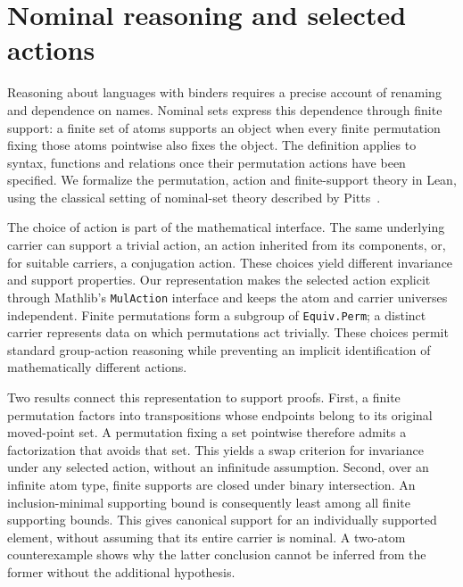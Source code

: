\section{Nominal reasoning and selected actions}
\label{sec:introduction}

Reasoning about languages with binders requires a precise account of renaming
and dependence on names. Nominal sets express this dependence through finite
support: a finite set of atoms supports an object when every finite permutation
fixing those atoms pointwise also fixes the object. The definition applies to
syntax, functions and relations once their permutation actions have been
specified. We formalize the permutation, action and finite-support theory in
Lean, using the classical setting of nominal-set theory described by
Pitts~\cite[Chapters 1--2]{pitts2013}.

The choice of action is part of the mathematical interface. The same underlying
carrier can support a trivial action, an action inherited from its components,
or, for suitable carriers, a conjugation action. These choices yield different
invariance and support properties. Our representation makes the selected
action explicit through Mathlib's \texttt{MulAction} interface and keeps the
atom and carrier universes independent. Finite permutations form a subgroup of
\texttt{Equiv.Perm}; a distinct carrier represents data on which permutations
act trivially. These choices permit standard group-action reasoning while
preventing an implicit identification of mathematically different actions.

Two results connect this representation to support proofs. First, a finite
permutation factors into transpositions whose endpoints belong to its original
moved-point set. A permutation fixing a set pointwise therefore admits a
factorization that avoids that set. This yields a swap criterion for invariance
under any selected action, without an infinitude assumption. Second, over an
infinite atom type, finite supports are closed under binary intersection.
An inclusion-minimal supporting bound is consequently least among all finite
supporting bounds. This gives canonical support for an individually supported
element, without assuming that its entire carrier is nominal.
A two-atom counterexample shows why the latter conclusion cannot be inferred
from the former without the additional hypothesis.

